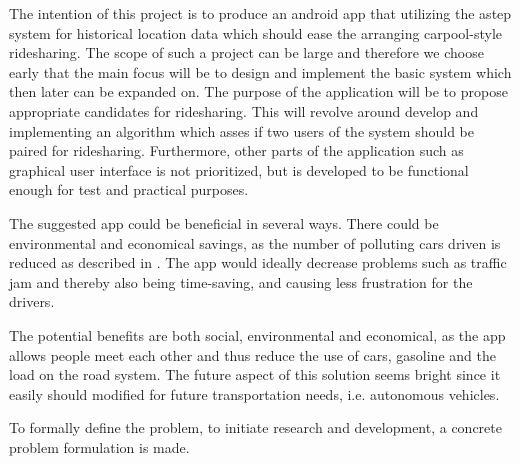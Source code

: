 The intention of this project is to produce an android app that utilizing the \gls{astep} system for historical location data which should ease the arranging carpool-style ridesharing.
The scope of such a project can be large and therefore we choose early that the main focus will be to design and implement the basic system which then later can be expanded on.
The purpose of the application will be to propose appropriate candidates for ridesharing.
This will revolve around develop and implementing an algorithm which asses if two users of the system should be paired for ridesharing.
Furthermore, other parts of the application such as graphical user interface is not prioritized, but is developed to be functional enough for test and practical purposes.

The suggested app could be beneficial in several ways.
There could be environmental and economical savings, as the number of polluting cars driven is reduced as described in \cite{doi:10.1080/01441647.2011.621557}.
The app would ideally decrease problems such as traffic jam and thereby also being time-saving, and causing less frustration for the drivers.

The potential benefits are both social, environmental and economical, as the app allows people meet each other and thus reduce the use of cars, gasoline and the load on the road system.
The future aspect of this solution seems bright since it easily should modified for future transportation needs, i.e. autonomous vehicles.

To formally define the problem, to initiate research and development, a concrete problem formulation is made.